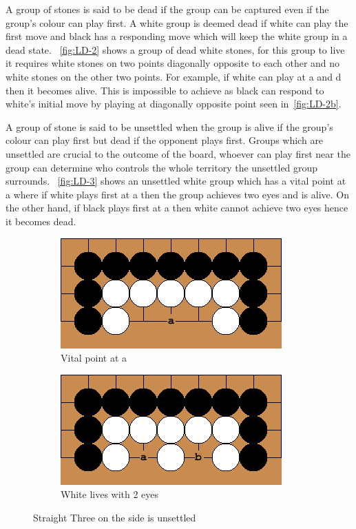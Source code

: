 \documentclass{l4proj}
\begin{document}
A group of stones is said to be dead if the group can be captured even if the group’s colour can play first. A white group is deemed dead if white can play the first move and black has a responding move which will keep the white group in a dead state. ~\autoref{fig:LD-2} shows a group of dead white stones, for this group to live it requires white stones on two points diagonally opposite to each other and no white stones on the other two points. For example, if white can play at a and d then it becomes alive. This is impossible to achieve as black can respond to white’s initial move by playing at diagonally opposite point seen in~\autoref{fig:LD-2b}.


A group of stone is said to be unsettled when the group is alive if the group’s colour can play first but dead if the opponent plays first. Groups which are unsettled are crucial to the outcome of the board, whoever can play first near the group can determine who controls the whole territory the unsettled group surrounds. ~\autoref{fig:LD-3} shows an unsettled white group which has a vital point at a where if white plays first at a then the group achieves two eyes and is alive. On the other hand, if black plays first at a then white cannot achieve two eyes hence it becomes dead.

\begin{figure}[!ht]
\centering
\begin{subfigure}[b]{0.4\textwidth}
\includegraphics[width=\textwidth]{LD/3a.png}
\caption{Vital point at a}
\label{fig:LD-3a}
\end{subfigure}\qquad
\begin{subfigure}[b]{0.4\textwidth}
\includegraphics[width=\textwidth]{LD/3b.png}
\caption{White lives with 2 eyes}
\label{fig:LD-3b}
\end{subfigure}
\caption{Straight Three on the side is unsettled}
\label{fig:LD-3}
\end{figure}
\end{document}
